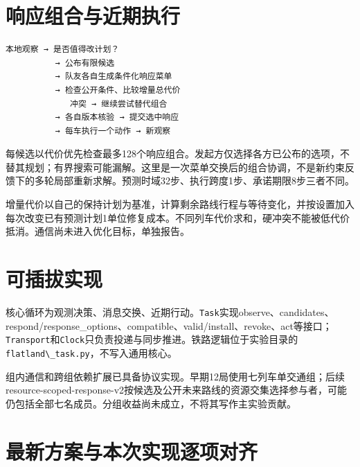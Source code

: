 \hypertarget{ux54cdux5e94ux7ec4ux5408ux4e0eux8fd1ux671fux6267ux884c}{%
\section{响应组合与近期执行}\label{ux54cdux5e94ux7ec4ux5408ux4e0eux8fd1ux671fux6267ux884c}}

\begin{lstlisting}
本地观察 → 是否值得改计划？
          → 公布有限候选
          → 队友各自生成条件化响应菜单
          → 检查公开条件、比较增量总代价
             冲突 → 继续尝试替代组合
          → 各自版本核验 → 提交选中响应
          → 每车执行一个动作 → 新观察
\end{lstlisting}

每候选以代价优先检查最多128个响应组合。发起方仅选择各方已公布的选项，不替其规划；有界搜索可能漏解。这里是一次菜单交换后的组合协调，不是新约束反馈下的多轮局部重新求解。预测时域32步、执行跨度1步、承诺期限8步三者不同。

增量代价以自己的保持计划为基准，计算剩余路线行程与等待变化，并按设置加入每次改变已有预测计划1单位修复成本。不同列车代价求和，硬冲突不能被低代价抵消。通信尚未进入优化目标，单独报告。

\hypertarget{ux53efux63d2ux62d4ux5b9eux73b0}{%
\section{可插拔实现}\label{ux53efux63d2ux62d4ux5b9eux73b0}}

核心循环为观测决策、消息交换、近期行动。\passthrough{\lstinline!Task!}实现observe、candidates、respond/response\_options、compatible、valid/install、revoke、act等接口；\passthrough{\lstinline!Transport!}和\passthrough{\lstinline!Clock!}只负责投递与同步推进。铁路逻辑位于实验目录的\passthrough{\lstinline!flatland\_task.py!}，不写入通用核心。

组内通信和跨组依赖扩展已具备协议实现。早期12局使用七列车单交通组；后续resource-scoped-response-v2按候选及公开未来路线的资源交集选择参与者，可能仍包括全部七名成员。分组收益尚未成立，不将其写作主实验贡献。

\hypertarget{ux6700ux65b0ux65b9ux6848ux4e0eux672cux6b21ux5b9eux73b0ux9010ux9879ux5bf9ux9f50}{%
\section{最新方案与本次实现逐项对齐}\label{ux6700ux65b0ux65b9ux6848ux4e0eux672cux6b21ux5b9eux73b0ux9010ux9879ux5bf9ux9f50}}

